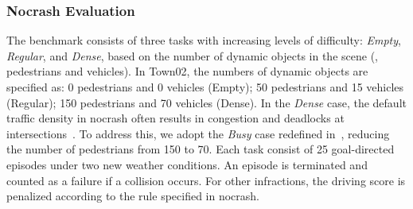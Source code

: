 \begin{table}
	\caption{Town05 results based on Carla's offline metrics. 
		All models are tested on Carla 0.9.13. 
		Mean values and standard deviations are computed from three runs with different random seeds.
		For metrics marked with $\uparrow$, higher values indicate better performance, while for those marked with $\downarrow$, lower values are preferred.}
	\centering
	\label{tab:T5_results}
\end{table}

\subsubsection{Nocrash Evaluation}\label{nocrash_metrics}

\hspace{1pc}The benchmark consists of three tasks with increasing levels of difficulty: \emph{Empty}, \emph{Regular}, and \emph{Dense}, based on the number of dynamic objects in the scene ({\ie}, pedestrians and vehicles). 
In Town02, the numbers of dynamic objects are specified as:	0 pedestrians and 0 vehicles (Empty); 50 pedestrians and 15 vehicles (Regular); 150 pedestrians and 70 vehicles (Dense).
%
In the \emph{Dense} case, the default traffic density in nocrash often results in congestion and deadlocks at intersections~\cite{Zhang:2021}. 
To address this, we adopt the \emph{Busy} case redefined in~\cite{Zhang:2021}, reducing the number of pedestrians from 150 to 70. 
Each task consist of 25 goal-directed episodes under two new weather conditions.
An episode is terminated and counted as a failure if a collision occurs. 
For other infractions, the driving score is penalized according to the rule specified in nocrash. 


